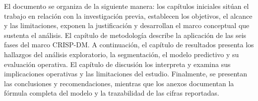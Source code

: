 El documento se organiza de la siguiente manera: los capítulos iniciales sitúan el trabajo en relación con la investigación previa, establecen los objetivos, el alcance y las limitaciones, exponen la justificación y desarrollan el marco conceptual que sustenta el análisis. El capítulo de metodología describe la aplicación de las seis fases del marco CRISP-DM. A continuación, el capítulo de resultados presenta los hallazgos del análisis exploratorio, la segmentación, el modelo predictivo y su evaluación operativa. El capítulo de discusión los interpreta y examina sus implicaciones operativas y las limitaciones del estudio. Finalmente, se presentan las conclusiones y recomendaciones, mientras que los anexos documentan la fórmula completa del modelo y la trazabilidad de las cifras reportadas.